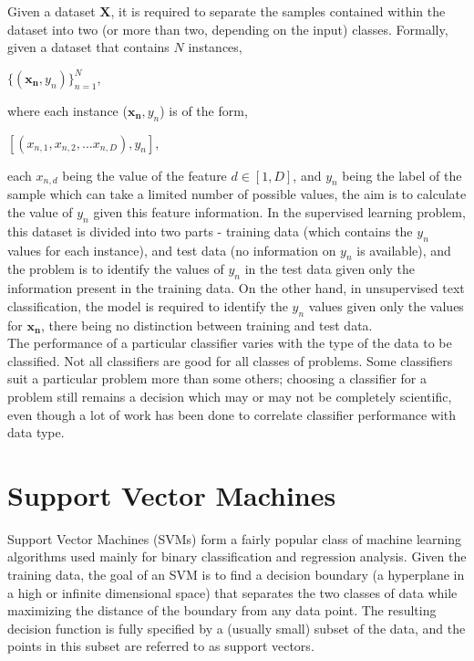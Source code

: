 Given a dataset $\mathbf{X}$, it is required to separate the samples contained within the dataset into two (or more than two, depending on the input) classes. Formally, given a dataset that contains $N$ instances,

\begin{center}
    $\{(\mathbf{x_n}, y_n)\}_{n = 1}^{N}$,
\end{center}

where each instance ($\mathbf{x_n}, y_n$) is of the form,

\begin{center}
    $[(x_{n, 1}, x_{n, 2}, ... x_{n, D}), y_{n}]$,
\end{center}

each $x_{n, d}$ being the value of the feature $d \in [1, D]$, and $y_n$ being the label of the sample which can take a limited number of possible values, the aim is to calculate the value of $y_n$ given this feature information. In the supervised learning problem, this dataset is divided into two parts - training data (which contains the $y_n$ values for each instance), and test data (no information on $y_n$ is available), and the problem is to identify the values of $y_n$ in the test data given only the information present in the training data. On the other hand, in unsupervised text classification, the model is required to identify the $y_n$ values given only the values for $\mathbf{x_n}$, there being no distinction between training and test data.\\

The performance of a particular classifier varies with the type of the data to be classified. Not all classifiers are good for all classes of problems. Some classifiers suit a particular problem more than some others; choosing a classifier for a problem still remains a decision which may or may not be completely scientific, even though a lot of work has been done to correlate classifier performance with data type.

\section{Support Vector Machines}
Support Vector Machines (SVMs) form a fairly popular class of machine learning algorithms used mainly for binary classification and regression analysis. Given the training data, the goal of an SVM is to find a decision boundary (a hyperplane in a high or infinite dimensional space) that separates the two classes of data while maximizing the distance of the boundary from any data point. The resulting decision function is fully specified by a (usually small) subset of the data, and the points in this subset are referred to as support vectors.\\

